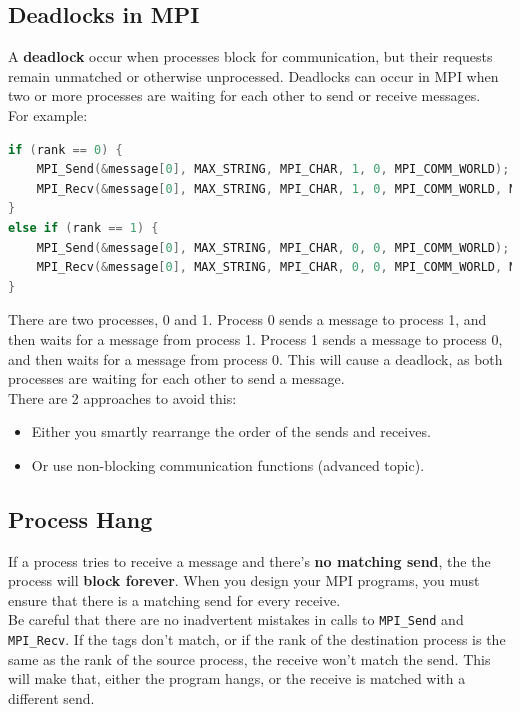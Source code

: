 \subsection{Deadlocks in MPI}

A \textbf{deadlock} occur when processes block for communication, but their requests remain
unmatched or otherwise unprocessed. Deadlocks can occur in MPI when two or more processes
are waiting for each other to send or receive messages.\\

For example:

\begin{lstlisting}[language=C++]
if (rank == 0) {
    MPI_Send(&message[0], MAX_STRING, MPI_CHAR, 1, 0, MPI_COMM_WORLD);
    MPI_Recv(&message[0], MAX_STRING, MPI_CHAR, 1, 0, MPI_COMM_WORLD, MPI_STATUS_IGNORE);
}
else if (rank == 1) {
    MPI_Send(&message[0], MAX_STRING, MPI_CHAR, 0, 0, MPI_COMM_WORLD);
    MPI_Recv(&message[0], MAX_STRING, MPI_CHAR, 0, 0, MPI_COMM_WORLD, MPI_STATUS_IGNORE);
}
\end{lstlisting}

There are two processes, 0 and 1. Process 0 sends a message to process 1, and then waits for
a message from process 1. Process 1 sends a message to process 0, and then waits for a message
from process 0. This will cause a deadlock, as both processes are waiting for each other to send a message.\\

There are 2 approaches to avoid this:
\begin{itemize}
    \item Either you smartly rearrange the order of the sends and receives.
    \item Or use non-blocking communication functions (advanced topic).
\end{itemize}

\subsection{Process Hang}

If a process tries to receive a message and there's \textbf{no matching send}, 
the the process will \textbf{block forever}. When you design your MPI programs,
you must ensure that there is a matching send for every receive.\\

Be careful that there are no inadvertent mistakes in calls to \texttt{MPI\_Send} and
\texttt{MPI\_Recv}. If the tags don't match, or if the rank of the destination process is
the same as the rank of the source process, the receive won't match the send. This will
make that, either the program hangs, or the receive is matched with a different send.

